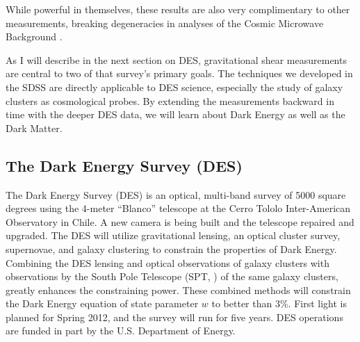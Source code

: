 \documentclass[12pt]{article}
\newcommand{\firstlight}{Spring 2012}
\begin{document}
While powerful in themselves, these results are also very complimentary to
other measurements, breaking degeneracies in analyses of the Cosmic Microwave
Background \cite{KomatsuWMAPCosmo09}. 

As I will describe in the next section on DES, gravitational shear measurements
are central to two of that survey's primary goals.  The techniques we developed
in the SDSS are directly applicable to DES science, especially the study of
galaxy clusters as cosmological probes.  By extending the measurements backward
in time with the deeper DES data, we will learn about Dark Energy as well as
the Dark Matter.

\subsection{The Dark Energy Survey (DES)}

The Dark Energy Survey (DES) is an optical, multi-band survey of 5000 square
degrees using the 4-meter ``Blanco'' telescope at the Cerro Tololo
Inter-American Observatory in Chile. A new camera is being built and the
telescope repaired and upgraded.  The DES will utilize gravitational lensing,
an optical cluster survey, supernovae, and galaxy clustering to constrain the
properties of Dark Energy.  Combining the DES lensing and optical observations
of galaxy clusters with observations by the South Pole Telescope (SPT,
\cite{SPT04}) of the same galaxy clusters, greatly enhances the constraining
power.  These combined methods will constrain the Dark Energy equation of state
parameter $w$ to better than 3\%.  First light is planned for \firstlight, and
the survey will run for five years.  DES operations are funded in part by the
U.S.  Department of Energy. 
\end{document}
